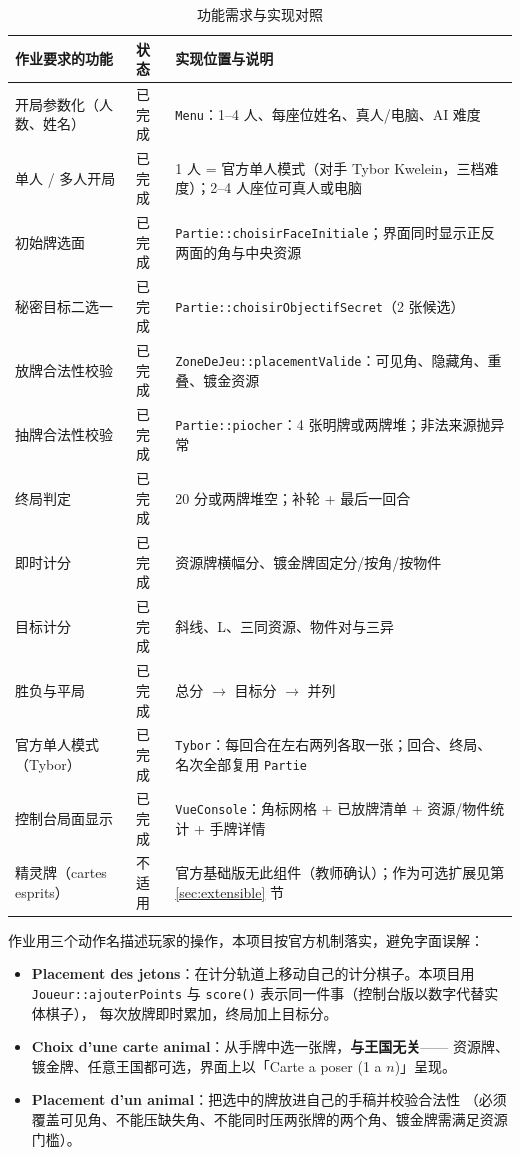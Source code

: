 \documentclass[11pt,a4paper]{ctexart}
\newcommand{\cl}[1]{\texttt{#1}}
\begin{document}
\begin{table}[h]
\centering
\small
\begin{tabular}{p{5.4cm}p{1.5cm}p{7.6cm}}
\toprule
作业要求的功能 & 状态 & 实现位置与说明 \\
\midrule
开局参数化（人数、姓名） & 已完成 & \cl{Menu}：1--4 人、每座位姓名、真人/电脑、AI 难度 \\
单人 / 多人开局 & 已完成 & 1 人 = 官方单人模式（对手 Tybor Kwelein，三档难度）；2--4 人座位可真人或电脑 \\
初始牌选面 & 已完成 & \cl{Partie::choisirFaceInitiale}；界面同时显示正反两面的角与中央资源 \\
秘密目标二选一 & 已完成 & \cl{Partie::choisirObjectifSecret}（2 张候选） \\
放牌合法性校验 & 已完成 & \cl{ZoneDeJeu::placementValide}：可见角、隐藏角、重叠、镀金资源 \\
抽牌合法性校验 & 已完成 & \cl{Partie::piocher}：4 张明牌或两牌堆；非法来源抛异常 \\
终局判定 & 已完成 & 20 分或两牌堆空；补轮 + 最后一回合 \\
即时计分 & 已完成 & 资源牌横幅分、镀金牌固定分/按角/按物件 \\
目标计分 & 已完成 & 斜线、L、三同资源、物件对与三异 \\
胜负与平局 & 已完成 & 总分 $\rightarrow$ 目标分 $\rightarrow$ 并列 \\
官方单人模式（Tybor） & 已完成 & \cl{Tybor}：每回合在左右两列各取一张；回合、终局、名次全部复用 \cl{Partie} \\
控制台局面显示 & 已完成 & \cl{VueConsole}：角标网格 + 已放牌清单 + 资源/物件统计 + 手牌详情 \\
精灵牌（cartes esprits） & 不适用 & 官方基础版无此组件（教师确认）；作为可选扩展见第 \ref{sec:extensible} 节 \\
\bottomrule
\end{tabular}
\caption{功能需求与实现对照}
\label{tab:fonctions}
\end{table}

作业用三个动作名描述玩家的操作，本项目按官方机制落实，避免字面误解：
\begin{itemize}
\item \textbf{Placement des jetons}：在计分轨道上移动自己的计分棋子。本项目用
      \cl{Joueur::ajouterPoints} 与 \cl{score()} 表示同一件事（控制台版以数字代替实体棋子），
      每次放牌即时累加，终局加上目标分。
\item \textbf{Choix d'une carte animal}：从手牌中选一张牌，\textbf{与王国无关}——
      资源牌、镀金牌、任意王国都可选，界面上以「Carte a poser (1 a $n$)」呈现。
\item \textbf{Placement d'un animal}：把选中的牌放进自己的手稿并校验合法性
      （必须覆盖可见角、不能压缺失角、不能同时压两张牌的两个角、镀金牌需满足资源门槛）。
\end{itemize}
\end{document}
